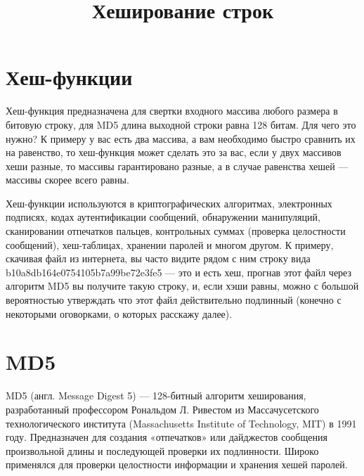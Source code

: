 \documentclass[a4paper, 12pt, oneside]{scrartcl}
\title{Хеширование строк}
\author{}
\date{}
\begin{document}
	\maketitle
	\section{Хеш-функции}\label{sec:section1}
	Хеш-функция предназначена для свертки входного массива любого размера в битовую строку, для MD5 длина выходной строки равна 128 битам. Для чего это нужно?
	К примеру у вас есть два массива, а вам необходимо быстро сравнить их на равенство, то хеш-функция может сделать это за вас, если у двух массивов хеши разные, то массивы гарантировано разные, а в случае равенства хешей — массивы скорее всего равны.
	
	Хеш-функции используются в криптографических алгоритмах, электронных подписях, кодах аутентификации сообщений, обнаружении манипуляций, сканировании отпечатков пальцев, контрольных суммах (проверка целостности сообщений), хеш-таблицах, хранении паролей и многом другом. К примеру, скачивая файл из интернета, вы часто видите рядом с ним строку вида b10a8db164e0754105b7a99be72e3fe5 — это и есть хеш, прогнав этот файл через алгоритм MD5 вы получите такую строку, и, если хэши равны, можно с большой вероятностью утверждать что этот файл действительно подлинный (конечно с некоторыми оговорками, о которых расскажу далее).~\cite{managementsystem}
	
	\section{MD5}\label{sec:section2}
	MD5 (англ. Message Digest 5) — 128-битный алгоритм хеширования, разработанный профессором Рональдом Л. Ривестом из Массачусетского технологического института (Massachusetts Institute of Technology, MIT) в 1991 году.
	Предназначен для создания «отпечатков» или дайджестов сообщения произвольной длины и последующей проверки их подлинности.
	Широко применялся для проверки целостности информации и хранения хешей паролей.
	
\end{document}
